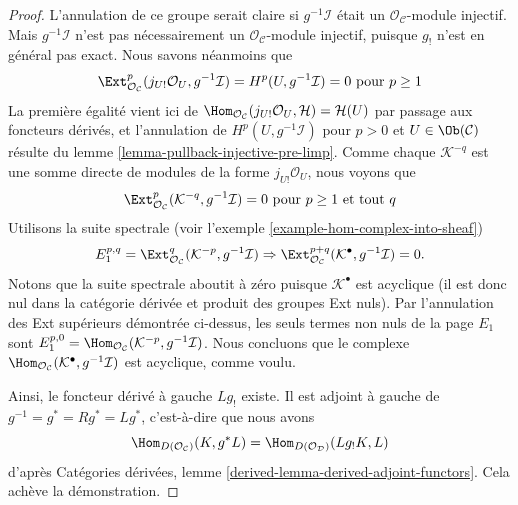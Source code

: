 \begin{proof}
\medskip\noindent
L'annulation de ce groupe serait claire si $g^{-1}\mathcal{I}$ était un
$\mathcal{O}_\mathcal{C}$-module injectif. Mais $g^{-1}\mathcal{I}$ n'est
pas nécessairement un $\mathcal{O}_\mathcal{C}$-module injectif, puisque
$g_!$ n'est en général pas exact. Nous
savons néanmoins que
$$
\Ext^p_{\mathcal{O}_\mathcal{C}}(
j_{U!}\mathcal{O}_U, g^{-1}\mathcal{I}) =
H^p(U, g^{-1}\mathcal{I}) = 0 \text{ pour }p \geq 1
$$
La première égalité vient ici de
$\Hom_{\mathcal{O}_\mathcal{C}}(j_{U!}\mathcal{O}_U, \mathcal{H}) =
\mathcal{H}(U)$ par passage aux foncteurs dérivés, et l'annulation de
$H^p(U, g^{-1}\mathcal{I})$ pour $p > 0$ et
$U \in \Ob(\mathcal{C})$ résulte du
lemme \ref{lemma-pullback-injective-pre-limp}.
Comme chaque $\mathcal{K}^{-q}$ est une somme directe de modules de la forme
$j_{U!}\mathcal{O}_U$, nous voyons que
$$
\Ext^p_{\mathcal{O}_\mathcal{C}}(\mathcal{K}^{-q}, g^{-1}\mathcal{I}) = 0
\text{ pour }p \geq 1\text{ et tout }q
$$
Utilisons la suite spectrale (voir l'exemple
\ref{example-hom-complex-into-sheaf})
$$
E_1^{p, q} = \Ext^q_{\mathcal{O}_\mathcal{C}}(
\mathcal{K}^{-p}, g^{-1}\mathcal{I})
\Rightarrow
\Ext^{p + q}_{\mathcal{O}_\mathcal{C}}(
\mathcal{K}^\bullet, g^{-1}\mathcal{I}) = 0.
$$
Notons que la suite spectrale aboutit à zéro puisque
$\mathcal{K}^\bullet$ est acyclique (il est donc nul dans la catégorie
dérivée et produit des groupes Ext nuls). Par l'annulation des Ext supérieurs
démontrée ci-dessus, les seuls termes non nuls de la page $E_1$ sont
$E_1^{p, 0} = \Hom_{\mathcal{O}_\mathcal{C}}(
\mathcal{K}^{-p}, g^{-1}\mathcal{I})$.
Nous concluons que le complexe
$\Hom_{\mathcal{O}_\mathcal{C}}(
\mathcal{K}^\bullet, g^{-1}\mathcal{I})$
est acyclique, comme voulu.

\medskip\noindent
Ainsi, le foncteur dérivé à gauche $Lg_!$ existe. Il est adjoint à gauche de
$g^{-1} = g^* = Rg^* = Lg^*$, c'est-à-dire que nous avons
\begin{equation}
\label{equation-to-prove}
\Hom_{D(\mathcal{O}_\mathcal{C})}(K, g^*L) =
\Hom_{D(\mathcal{O}_\mathcal{D})}(Lg_!K, L)
\end{equation}
d'après Catégories dérivées, lemme
\ref{derived-lemma-derived-adjoint-functors}. Cela achève la démonstration.
\end{proof}

